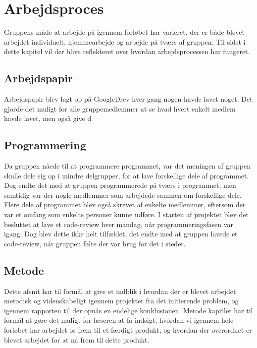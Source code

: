 \chapter{Arbejdsproces}\label{Arbejdsproces}
Gruppens måde at arbejde på igennem forløbet har varieret, der er både blevet arbejdet individuelt, hjemmearbejde og arbejde på tværs af gruppen. Til sidst i dette kapitel vil der blive reflekteret over hvordan arbejdsprocessen har fungeret.


\section{Arbejdspapir}\label{Arbejdspapir}
Arbejdspapir blev lagt op på GoogleDrev hver gang nogen havde lavet noget. Det gjorde det muligt for alle gruppemedlemmer at se hvad hvert enkelt medlem havde lavet, men også give d 

\section{Programmering}\label{Programmering}

Da gruppen nåede til at programmere programmet, var det meningen af gruppen skulle dele sig op i mindre delgrupper, for at lave forskellige dele af programmet. Dog endte det med at gruppen programmerede på tværs i programmet, men samtidig var der nogle medlemmer som arbejdede sammen om forskellige dele. Flere dele af programmet blev også skrevet af enkelte medlemmer, eftersom det var et omfang som enkelte personer kunne udføre. I starten af projektet blev det besluttet at lave et code-review hver mandag, når programmeringsfasen var igang. Dog blev dette ikke helt tilfældet, det endte med at gruppen lavede et code-review, når gruppen følte der var brug for det i stedet. 


\section{Metode}\label{Metode}

Dette afsnit har til formål at give et indblik i hvordan der er blevet arbejdet metodisk og videnskabeligt igennem projektet fra det initierende problem, og igennem rapporten til der opnås en endelige konklusionen. Metode kapitlet har til formål at gøre det muligt for læseren at få indsigt, hvordan vi igennem hele forløbet har arbejdet os frem til et færdigt produkt, og hvordan der overordnet er blevet arbejdet for at nå frem til dette produkt. 

